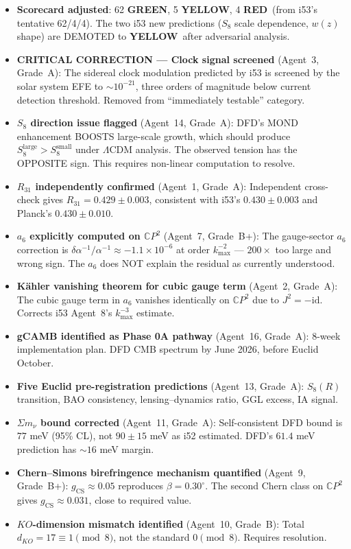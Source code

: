 \documentclass[11pt,a4paper]{article}
\newcommand{\GREEN}{\textcolor{dfdgreen}{\textbf{GREEN}}}
\newcommand{\YELLOW}{\textcolor{dfdyellow}{\textbf{YELLOW}}}
\newcommand{\RED}{\textcolor{dfdred}{\textbf{RED}}}
\newcommand{\CP}{\mathbb{C}P}
\begin{document}
\begin{itemize}
\item \textbf{Scorecard adjusted}: 62 \GREEN, 5 \YELLOW, 4 \RED\ (from i53's tentative 62/4/4). The two i53 new predictions ($S_8$ scale dependence, $w(z)$ shape) are DEMOTED to \YELLOW\ after adversarial analysis.
\item \textbf{CRITICAL CORRECTION --- Clock signal screened} (Agent~3, Grade~A): The sidereal clock modulation predicted by i53 is screened by the solar system EFE to $\sim 10^{-21}$, three orders of magnitude below current detection threshold. Removed from ``immediately testable'' category.
\item \textbf{$S_8$ direction issue flagged} (Agent~14, Grade~A): DFD's MOND enhancement BOOSTS large-scale growth, which should produce $S_8^{\mathrm{large}} > S_8^{\mathrm{small}}$ under $\Lambda$CDM analysis. The observed tension has the OPPOSITE sign. This requires non-linear computation to resolve.
\item \textbf{$R_{31}$ independently confirmed} (Agent~1, Grade~A): Independent cross-check gives $R_{31} = 0.429 \pm 0.003$, consistent with i53's $0.430 \pm 0.003$ and Planck's $0.430 \pm 0.010$.
\item \textbf{$a_6$ explicitly computed on $\CP^2$} (Agent~7, Grade~B+): The gauge-sector $a_6$ correction is $\delta\alpha^{-1}/\alpha^{-1} \approx -1.1 \times 10^{-6}$ at order $k_{\max}^{-2}$ --- $200\times$ too large and wrong sign. The $a_6$ does NOT explain the residual as currently understood.
\item \textbf{K\"ahler vanishing theorem for cubic gauge term} (Agent~2, Grade~A): The cubic gauge term in $a_6$ vanishes identically on $\CP^2$ due to $J^2 = -\mathrm{id}$. Corrects i53 Agent~8's $k_{\max}^{-3}$ estimate.
\item \textbf{gCAMB identified as Phase 0A pathway} (Agent~16, Grade~A): 8-week implementation plan. DFD CMB spectrum by June 2026, before Euclid October.
\item \textbf{Five Euclid pre-registration predictions} (Agent~13, Grade~A): $S_8(R)$ transition, BAO consistency, lensing--dynamics ratio, GGL excess, IA signal.
\item \textbf{$\Sigma m_\nu$ bound corrected} (Agent~11, Grade~A): Self-consistent DFD bound is $77$ meV (95\% CL), not $90 \pm 15$ meV as i52 estimated. DFD's $61.4$ meV prediction has $\sim 16$ meV margin.
\item \textbf{Chern--Simons birefringence mechanism quantified} (Agent~9, Grade~B+): $g_{\mathrm{CS}} \approx 0.05$ reproduces $\beta = 0.30^\circ$. The second Chern class on $\CP^2$ gives $g_{\mathrm{CS}} \approx 0.031$, close to required value.
\item \textbf{$KO$-dimension mismatch identified} (Agent~10, Grade~B): Total $d_{KO} = 17 \equiv 1 \pmod{8}$, not the standard $0 \pmod{8}$. Requires resolution.
\end{itemize}
\end{document}
